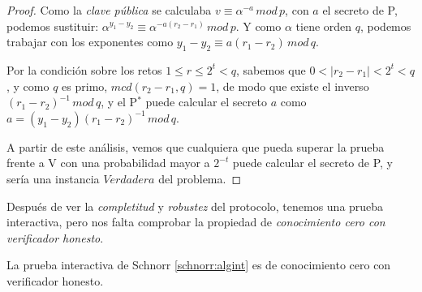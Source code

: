 \begin{proof}
	Como la \textit{clave pública} se calculaba $v\equiv \alpha^{-a} \, mod \, p$, con $a$ el secreto de P, podemos sustituir: $\alpha^{y_1 - y_2} \equiv \alpha ^{-a(r_2 - r_1)}  \, mod \, p$. Y como $\alpha$ tiene orden $q$, podemos trabajar con los exponentes como $y_1 - y_2 \equiv a(r_1 - r_2) \, mod \, q$.
	
	Por la condición sobre los retos $1\leq r \leq 2^t < q$, sabemos que $0 < \mid r_2 - r_1 \mid < 2^t < q$, y como $q$ es primo, $mcd(r_2-r_1,q)=1$, de modo que existe el inverso $(r_1 - r_2)^{-1} \, mod \, q$, y el P$^*$ puede calcular el secreto $a$ como $a = (y_1-y_2)(r_1-r_2)^{-1}\, mod \, q$.
	
	A partir de este análisis, vemos que cualquiera que pueda superar la prueba frente a V con una probabilidad mayor a $2^{-t}$ puede calcular el secreto de P, y sería una instancia $Verdadera$ del problema.
	
	
	
\end{proof}





\hfil



Después de ver la \textit{completitud} y \textit{robustez} del protocolo, tenemos una prueba interactiva, pero nos falta comprobar la propiedad de \textit{conocimiento cero con verificador honesto}.

\begin{theorem}
	La prueba interactiva de Schnorr \ref{schnorr:algint} es de conocimiento cero con verificador honesto.
\end{theorem}

